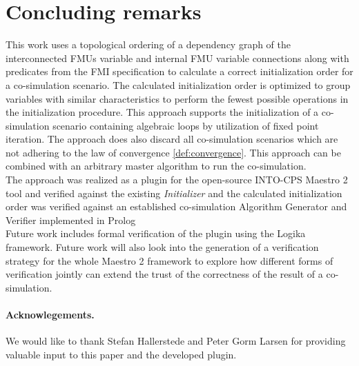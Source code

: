 \section{Concluding remarks}\label{sc:summary}
This work uses a topological ordering of a dependency graph of the interconnected FMUs variable and internal FMU variable connections along with predicates from the FMI specification to calculate a correct initialization order for a co-simulation scenario. The calculated initialization order is optimized to group variables with similar characteristics to perform the fewest possible operations in the initialization procedure.
This approach supports the initialization of a co-simulation scenario containing algebraic loops by utilization of fixed point iteration. The approach does also discard all co-simulation scenarios which are not adhering to the law of convergence \ref{def:convergence}.
This approach can be combined with an arbitrary master algorithm to run the co-simulation. \\
The approach was realized as a plugin for the open-source INTO-CPS Maestro 2 tool and verified against the existing \textit{Initializer} and the calculated initialization order was verified against an established co-simulation Algorithm Generator and Verifier implemented in Prolog\cite{gomes_lucio_vangheluwe_2019}\\
Future work includes formal verification of the plugin using the Logika framework\cite{inbook}.
Future work will also look into the generation of a verification strategy for the whole Maestro 2 framework to explore how different forms of verification jointly can extend the trust of the correctness of the result of a co-simulation. 

\paragraph*{\textbf{Acknowlegements.}}We would like to thank Stefan Hallerstede and Peter Gorm Larsen for providing valuable input to this paper and the developed plugin.